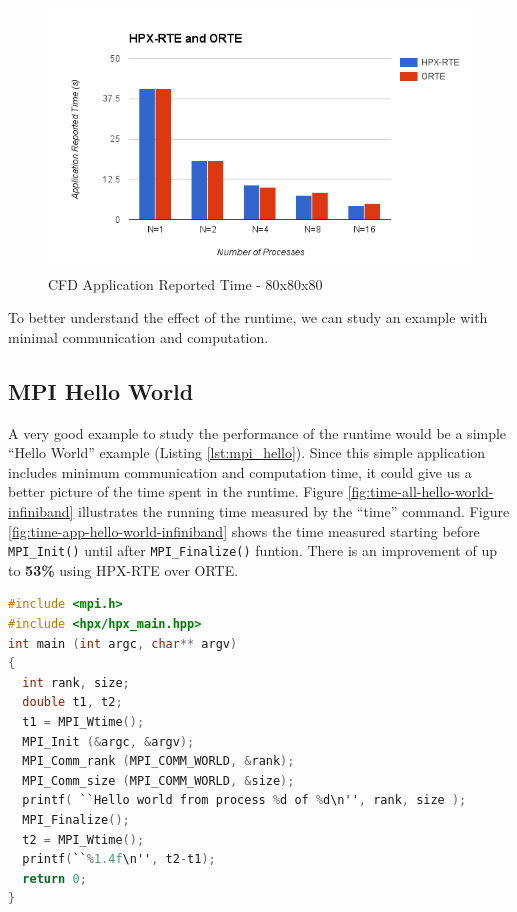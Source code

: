 \begin{figure}[h]
  \centering
  \includegraphics[scale=0.7]{images/time-app-heatsolver-80-infiniband.png}
  \caption[CFD Application Reported Time - 80x80x80]{CFD Application Reported Time - 80x80x80}
  \label{fig:time-app-heatsolver-80-infiniband}
\end{figure}

To better understand the effect of the runtime, we can study an example with minimal communication and computation. 

\clearpage
\subsection{MPI Hello World}
A very good example to study the performance of the runtime would be a simple ``Hello World'' example (Listing \ref{lst:mpi_hello}). Since this simple application includes minimum communication and computation time, it could give us a better picture of the time spent in the runtime. Figure \ref{fig:time-all-hello-world-infiniband} illustrates the running time measured by the ``time'' command. Figure \ref{fig:time-app-hello-world-infiniband} shows the time measured starting before \verb|MPI_Init()| until after \verb|MPI_Finalize()| funtion. There is an improvement of up to \textbf{53\%} using HPX-RTE over ORTE.

\begin{lstlisting}[language=C, frame=single, basicstyle=\footnotesize, caption=MPI Hello World \label{lst:mpi_hello}]
#include <mpi.h>
#include <hpx/hpx_main.hpp>
int main (int argc, char** argv)
{
  int rank, size;
  double t1, t2;
  t1 = MPI_Wtime();
  MPI_Init (&argc, &argv);
  MPI_Comm_rank (MPI_COMM_WORLD, &rank);
  MPI_Comm_size (MPI_COMM_WORLD, &size);
  printf( ``Hello world from process %d of %d\n'', rank, size );
  MPI_Finalize();
  t2 = MPI_Wtime();
  printf(``%1.4f\n'', t2-t1);
  return 0;
}
\end{lstlisting}


